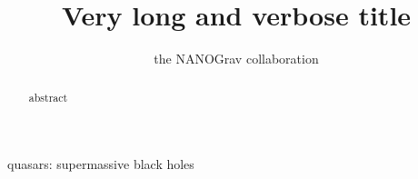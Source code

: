 %
%
%





\newcommand{\thardf}{\tau_f}
\newcommand{\holodeck}{\texttt{holodeck}}
\newcommand{\python}{\texttt{python}}
\newcommand{\mmbulge}{{$M_\textrm{BH}$--$M_\textrm{bulge}$}}


\def\oldbibitem{} \let\oldbibitem=\bibitem
\def\bibitem{\stepcounter{citnum}\oldbibitem}

\newcommand{\orcidauthorA}{0000-0002-6625-6450} %

\title[Short Title]{Very long and verbose title}
\author[NANOGrav]{the NANOGrav collaboration}




\maketitle

\begin{abstract}
    abstract
\end{abstract}

\begin{keywords}
    quasars: supermassive black holes
\end{keywords}



